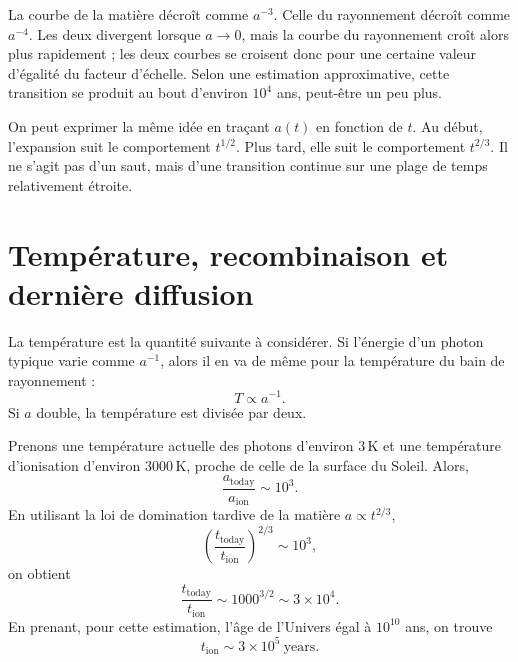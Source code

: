 
La courbe de la matière décroît comme \(a^{-3}\). Celle du rayonnement décroît comme \(a^{-4}\). Les deux divergent lorsque \(a\to 0\), mais la courbe du rayonnement croît alors plus rapidement ; les deux courbes se croisent donc pour une certaine valeur d’égalité du facteur d’échelle. Selon une estimation approximative, cette transition se produit au bout d’environ \(10^4\) ans, peut-être un peu plus.

On peut exprimer la même idée en traçant \(a(t)\) en fonction de \(t\). Au début, l’expansion suit le comportement \(t^{1/2}\). Plus tard, elle suit le comportement \(t^{2/3}\). Il ne s’agit pas d’un saut, mais d’une transition continue sur une plage de temps relativement étroite.

\begin{classroomqa}
\end{classroomqa}

\section{Température, recombinaison et dernière diffusion}

La température est la quantité suivante à considérer. Si l’énergie d’un photon typique varie comme \(a^{-1}\), alors il en va de même pour la température du bain de rayonnement :
\begin{equation}
T\propto a^{-1}.
\end{equation}
Si \(a\) double, la température est divisée par deux.

Prenons une température actuelle des photons d’environ \(3\,\mathrm K\) et une température d’ionisation d’environ \(3000\,\mathrm K\), proche de celle de la surface du Soleil. Alors,
\begin{equation}
\frac{a_{\mathrm{today}}}{a_{\mathrm{ion}}}\sim 10^3.
\end{equation}
En utilisant la loi de domination tardive de la matière \(a\propto t^{2/3}\),
\begin{equation}
\left(\frac{t_{\mathrm{today}}}{t_{\mathrm{ion}}}\right)^{2/3}\sim 10^3,
\end{equation}
on obtient
\begin{equation}
\frac{t_{\mathrm{today}}}{t_{\mathrm{ion}}}\sim 1000^{3/2}\sim 3\times 10^4.
\end{equation}
En prenant, pour cette estimation, l’âge de l’Univers égal à \(10^{10}\) ans, on trouve
\begin{equation}
t_{\mathrm{ion}}\sim 3\times 10^5\ \mathrm{years}.
\end{equation}

